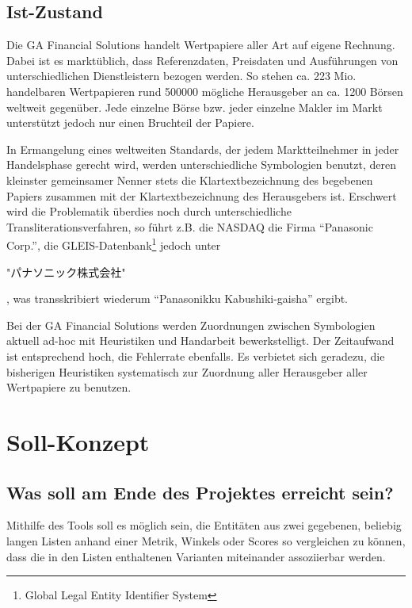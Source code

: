 \documentclass[fontsize=12pt,paper=a4,draft=off,titlepage=off]{scrartcl}
\begin{document}
\subsection{Ist-Zustand}
Die GA Financial Solutions handelt Wertpapiere aller Art auf eigene
Rechnung.  Dabei ist es marktüblich, dass Referenzdaten, Preisdaten
und Ausführungen von unterschiedlichen Dienstleistern bezogen werden.
So stehen ca. 223 Mio. handelbaren Wertpapieren rund 500000 mögliche
Herausgeber an ca. 1200 Börsen weltweit gegenüber.  Jede einzelne
Börse bzw. jeder einzelne Makler im Markt unterstützt jedoch nur
einen Bruchteil der Papiere.\par

In Ermangelung eines weltweiten Standards, der jedem Marktteilnehmer in
jeder Handelsphase gerecht wird, werden unterschiedliche Symbologien
benutzt, deren kleinster gemeinsamer Nenner stets die
Klartextbezeichnung des begebenen Papiers zusammen mit der
Klartextbezeichnung des Herausgebers ist.  Erschwert wird die
Problematik überdies noch durch unterschiedliche Transliterationsverfahren,
so führt z.B. die NASDAQ die Firma "`Panasonic Corp."',
die GLEIS-Datenbank\footnote{Global Legal Entity Identifier System} jedoch unter
\begin{CJK}{UTF8}{min}
"パナソニック株式会社"
\end{CJK}%
, was transskribiert wiederum "`Panasonikku Kabushiki-gaisha"' ergibt. \par

Bei der GA Financial Solutions werden Zuordnungen zwischen Symbologien
aktuell ad-hoc mit Heuristiken und Handarbeit bewerkstelligt.  Der
Zeitaufwand ist entsprechend hoch, die Fehlerrate ebenfalls.  Es
verbietet sich geradezu, die bisherigen Heuristiken systematisch zur
Zuordnung aller Herausgeber aller Wertpapiere zu benutzen.\par


\clearpage

\section{Soll-Konzept}

\subsection{Was soll am Ende des Projektes erreicht sein?}
Mithilfe des Tools soll es möglich sein, die Entitäten aus zwei gegebenen,
beliebig langen Listen anhand einer Metrik, Winkels oder Scores
so vergleichen zu können, dass die in den Listen enthaltenen Varianten
miteinander assoziierbar werden.\par
\end{document}

